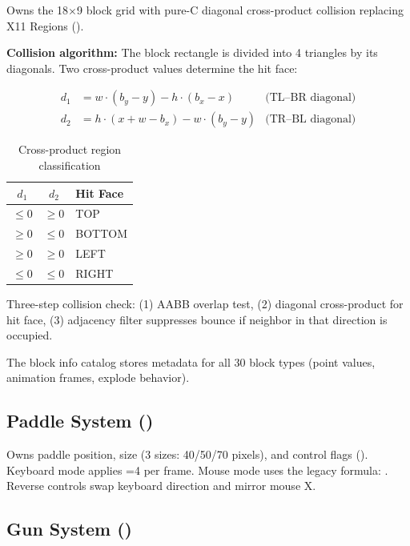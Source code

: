 \documentclass[11pt,a4paper]{article}
\begin{document}
Owns the 18$\times$9 block grid with pure-C diagonal cross-product collision replacing X11 Regions ().

\textbf{Collision algorithm:} The block rectangle is divided into 4 triangles by its diagonals. Two cross-product values determine the hit face:

\begin{align}
d_1 &= w \cdot (b_y - y) - h \cdot (b_x - x) & \text{(TL--BR diagonal)} \label{eq:d1} \\
d_2 &= h \cdot (x + w - b_x) - w \cdot (b_y - y) & \text{(TR--BL diagonal)} \label{eq:d2}
\end{align}

\begin{table}[h]
\centering
\caption{Cross-product region classification}
\label{tab:cross-product}
\begin{tabular}{ccl}
\toprule
$d_1$ & $d_2$ & \textbf{Hit Face} \\
\midrule
$\leq 0$ & $\geq 0$ & TOP \\
$\geq 0$ & $\leq 0$ & BOTTOM \\
$\geq 0$ & $\geq 0$ & LEFT \\
$\leq 0$ & $\leq 0$ & RIGHT \\
\bottomrule
\end{tabular}
\end{table}

Three-step collision check: (1) AABB overlap test, (2) diagonal cross-product for hit face, (3) adjacency filter suppresses bounce if neighbor in that direction is occupied.

The block info catalog stores metadata for all 30 block types (point values, animation frames, explode behavior).

\subsection{Paddle System ()}
\label{sec:paddle-system}

Owns paddle position, size (3 sizes: 40/50/70 pixels), and control flags (). Keyboard mode applies =4 per frame. Mouse mode uses the legacy formula: . Reverse controls swap keyboard direction and mirror mouse X.

\subsection{Gun System ()}
\label{sec:gun-system}
\end{document}
